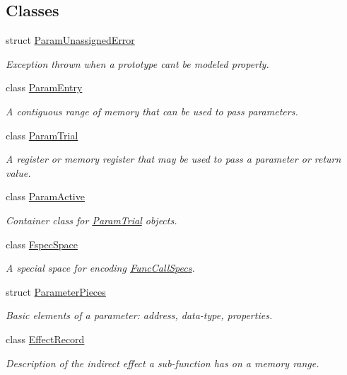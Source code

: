 \subsection*{Classes}
\begin{DoxyCompactItemize}
\item 
struct \mbox{\hyperlink{struct_param_unassigned_error}{Param\+Unassigned\+Error}}
\begin{DoxyCompactList}\small\item\em Exception thrown when a prototype can\textquotesingle{}t be modeled properly. \end{DoxyCompactList}\item 
class \mbox{\hyperlink{class_param_entry}{Param\+Entry}}
\begin{DoxyCompactList}\small\item\em A contiguous range of memory that can be used to pass parameters. \end{DoxyCompactList}\item 
class \mbox{\hyperlink{class_param_trial}{Param\+Trial}}
\begin{DoxyCompactList}\small\item\em A register or memory register that may be used to pass a parameter or return value. \end{DoxyCompactList}\item 
class \mbox{\hyperlink{class_param_active}{Param\+Active}}
\begin{DoxyCompactList}\small\item\em Container class for \mbox{\hyperlink{class_param_trial}{Param\+Trial}} objects. \end{DoxyCompactList}\item 
class \mbox{\hyperlink{class_fspec_space}{Fspec\+Space}}
\begin{DoxyCompactList}\small\item\em A special space for encoding \mbox{\hyperlink{class_func_call_specs}{Func\+Call\+Specs}}. \end{DoxyCompactList}\item 
struct \mbox{\hyperlink{struct_parameter_pieces}{Parameter\+Pieces}}
\begin{DoxyCompactList}\small\item\em Basic elements of a parameter\+: address, data-\/type, properties. \end{DoxyCompactList}\item 
class \mbox{\hyperlink{class_effect_record}{Effect\+Record}}
\begin{DoxyCompactList}\small\item\em Description of the indirect effect a sub-\/function has on a memory range. \end{DoxyCompactList}\item 

\end{DoxyCompactItemize}
